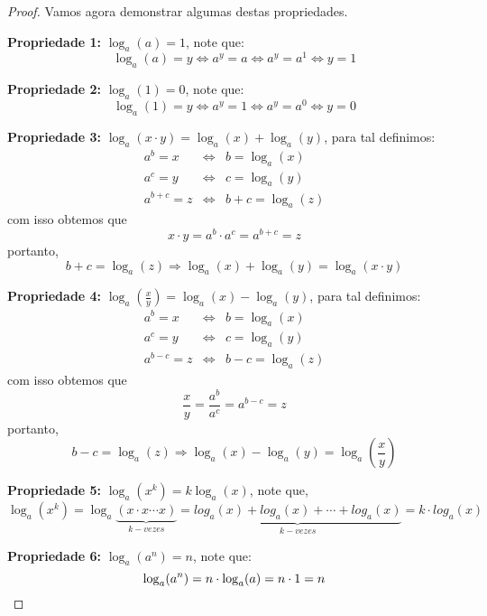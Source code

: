 \begin{proof}
  Vamos agora demonstrar algumas destas propriedades.

  \textbf{Propriedade 1:} $\log_{a}(a)= 1$, note que:
\begin{equation*}
\log_{a}(a)= y \Leftrightarrow a^y = a \Leftrightarrow a^y= a^1 \Leftrightarrow y=1
\end{equation*}

  \textbf{Propriedade 2:} $\log_{a}(1)= 0$, note que:
\begin{equation*}
\log_{a}(1)= y \Leftrightarrow a^y= 1 \Leftrightarrow a^y= a^0 \Leftrightarrow y=0
\end{equation*}

  \textbf{Propriedade 3:} $\log_{a}(x \cdot y)=\log_{a}(x) + \log_{a}(y)$, para tal definimos:
  \begin{eqnarray*}
   a^b= x & \Leftrightarrow & b= \log_{a}(x) \\
   a^c= y & \Leftrightarrow & c= \log_{a}(y) \\
   a^{b+c}= z & \Leftrightarrow & b+c= \log_{a}(z)
  \end{eqnarray*}
  com isso obtemos que
\begin{equation*}
x \cdot y= a^b \cdot a^c= a^{b+c}= z
\end{equation*}
  portanto,
\begin{equation*}
b+c= \log_{a}(z) \Rightarrow \log_{a}(x) + \log_{a}(y)= \log_{a}(x \cdot y)
\end{equation*}

  \textbf{Propriedade 4:} $\log_{a} \left(\frac{x}{y}\right)=\log_{a}(x) - \log_{a}(y)$, para tal definimos:
  \begin{eqnarray*}
   a^b= x & \Leftrightarrow & b= \log_{a}(x) \\
   a^c= y & \Leftrightarrow & c= \log_{a}(y) \\
   a^{b-c}= z & \Leftrightarrow & b-c= \log_{a}(z)
  \end{eqnarray*}
  com isso obtemos que
\begin{equation*}
\dfrac{x}{y}= \dfrac{a^b}{a^c}= a^{b-c}= z
\end{equation*}
  portanto,
\begin{equation*}
b-c= \log_{a}(z) \Rightarrow \log_{a}(x) - \log_{a}(y)= \log_{a}\left(\frac{x}{y}\right)
\end{equation*}

  \textbf{Propriedade 5:} $\log_{a}(x^k)= k \log_{a}(x)$, note que,
\begin{equation*}
\log_{a}(x^k)= \log_{a}\underbrace{(x \cdot x \cdots x)}_{k-vezes}= \underbrace{log_{a}(x) + log_{a}(x)+ \cdots + log_{a}(x)}_{k-vezes}= k \cdot log_{a}(x)
\end{equation*}

  \textbf{Propriedade 6:} $\log_{a}(a^n)= n$, note que:
\begin{equation*}
\log_{a}(a^n)= n \cdot \log_{a}(a)= n \cdot 1 = n\qedhere
\end{equation*}
\end{proof}

